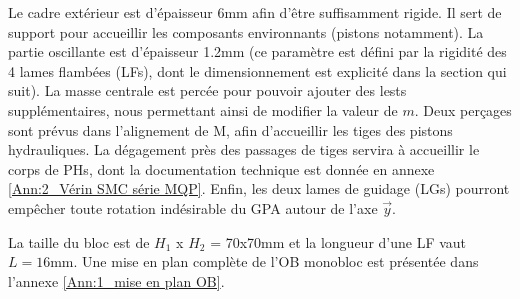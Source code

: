 Le cadre extérieur est d'épaisseur 6mm afin d'être suffisamment rigide. Il sert de support pour accueillir les composants environnants (pistons notamment). La partie oscillante est d'épaisseur 1.2mm (ce paramètre est défini par la rigidité des 4 lames flambées (LFs), dont le dimensionnement est explicité dans la section qui suit). La masse centrale est percée pour pouvoir ajouter des lests supplémentaires, nous permettant ainsi de modifier la valeur de $m$. Deux perçages sont prévus dans l'alignement de M, afin d'accueillir les tiges des pistons hydrauliques. La dégagement près des passages de tiges servira à accueillir le corps de PHs, dont la documentation technique est donnée en annexe \ref{Ann:2_Vérin SMC série MQP}. Enfin, les deux lames de guidage (LGs) pourront empêcher toute rotation indésirable du GPA autour de l'axe $\vec{y}$.

La taille du bloc est de $H_1$ x $H_2$ = 70x70mm et la longueur d'une LF vaut $L=16$mm. Une mise en plan complète de l'OB monobloc est présentée dans l'annexe \ref{Ann:1_mise en plan OB}.
 
